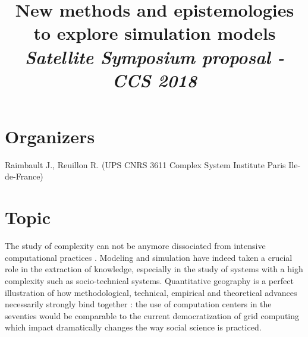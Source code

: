 \documentclass[11pt]{article}
\begin{document}
\title{\vspace{-2cm}New methods and epistemologies to explore simulation models
\bigskip\\
\textit{Satellite Symposium proposal - CCS 2018}
}

\date{}

\maketitle

\justify



\section*{Organizers}

Raimbault J., Reuillon R.  (UPS CNRS 3611 Complex System Institute Paris Ile-de-France)



\section*{Topic}


The study of complexity can not be anymore dissociated from intensive computational practices \citep{arthur2015complexity}. Modeling and simulation have indeed taken a crucial role in the extraction of knowledge, especially in the study of systems with a high complexity such as socio-technical systems. Quantitative geography is a perfect illustration of how methodological, technical, empirical and theoretical advances necessarily strongly bind together  \citep{rey2015plateforme}: the use of computation centers in the seventies would be comparable to the current democratization of grid computing which impact dramatically changes the way social science is practiced.
\end{document}
